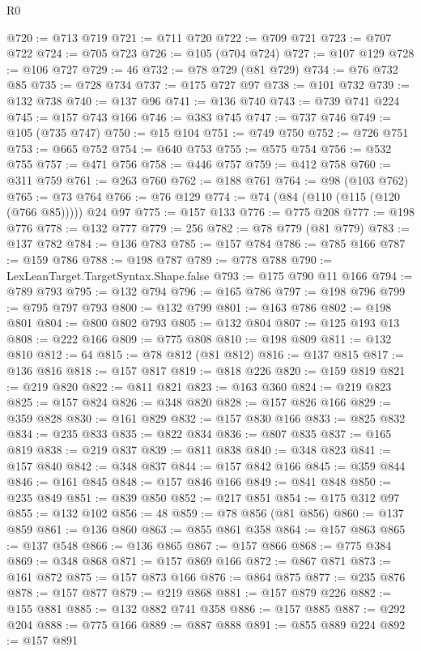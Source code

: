 \begin{lexlean}{R0}
\begin{coremodule}
@720 := @713 @719
@721 := @711 @720
@722 := @709 @721
@723 := @707 @722
@724 := @705 @723
@726 := @105 (@704 @724)
@727 := @107 @129
@728 := @106 @727
@729 := 46
@732 := @78 @729 (@81 @729)
@734 := @76 @732 @85
@735 := @728 @734
@737 := @175 @727 @97
@738 := @101 @732
@739 := @132 @738
@740 := @137 @96
@741 := @136 @740
@743 := @739 @741 @224
@745 := @157 @743 @166
@746 := @383 @745
@747 := @737 @746
@749 := @105 (@735 @747)
@750 := @15 @104
@751 := @749 @750
@752 := @726 @751
@753 := @665 @752
@754 := @640 @753
@755 := @575 @754
@756 := @532 @755
@757 := @471 @756
@758 := @446 @757
@759 := @412 @758
@760 := @311 @759
@761 := @263 @760
@762 := @188 @761
@764 := @98 (@103 @762)
@765 := @73 @764
@766 := @76 @129
@774 := @74 (@84 (@110 (@115 (@120 (@766 @85))))) @24 @97
@775 := @157 @133
@776 := @775 @208
@777 := @198 @776
@778 := @132 @777
@779 := 256
@782 := @78 @779 (@81 @779)
@783 := @137 @782
@784 := @136 @783
@785 := @157 @784
@786 := @785 @166
@787 := @159 @786
@788 := @198 @787
@789 := @778 @788
@790 := LexLeanTarget.TargetSyntax.Shape.false
@793 := @175 @790 @11 @166
@794 := @789 @793
@795 := @132 @794
@796 := @165 @786
@797 := @198 @796
@799 := @795 @797 @793
@800 := @132 @799
@801 := @163 @786
@802 := @198 @801
@804 := @800 @802 @793
@805 := @132 @804
@807 := @125 @193 @13
@808 := @222 @166
@809 := @775 @808
@810 := @198 @809
@811 := @132 @810
@812 := 64
@815 := @78 @812 (@81 @812)
@816 := @137 @815
@817 := @136 @816
@818 := @157 @817
@819 := @818 @226
@820 := @159 @819
@821 := @219 @820
@822 := @811 @821
@823 := @163 @360
@824 := @219 @823
@825 := @157 @824
@826 := @348 @820
@828 := @157 @826 @166
@829 := @359 @828
@830 := @161 @829
@832 := @157 @830 @166
@833 := @825 @832
@834 := @235 @833
@835 := @822 @834
@836 := @807 @835
@837 := @165 @819
@838 := @219 @837
@839 := @811 @838
@840 := @348 @823
@841 := @157 @840
@842 := @348 @837
@844 := @157 @842 @166
@845 := @359 @844
@846 := @161 @845
@848 := @157 @846 @166
@849 := @841 @848
@850 := @235 @849
@851 := @839 @850
@852 := @217 @851
@854 := @175 @312 @97
@855 := @132 @102
@856 := 48
@859 := @78 @856 (@81 @856)
@860 := @137 @859
@861 := @136 @860
@863 := @855 @861 @358
@864 := @157 @863
@865 := @137 @548
@866 := @136 @865
@867 := @157 @866
@868 := @775 @384
@869 := @348 @868
@871 := @157 @869 @166
@872 := @867 @871
@873 := @161 @872
@875 := @157 @873 @166
@876 := @864 @875
@877 := @235 @876
@878 := @157 @877
@879 := @219 @868
@881 := @157 @879 @226
@882 := @155 @881
@885 := @132 @882 @741 @358
@886 := @157 @885
@887 := @292 @204
@888 := @775 @166
@889 := @887 @888
@891 := @855 @889 @224
@892 := @157 @891

\end{coremodule}
\end{lexlean}
